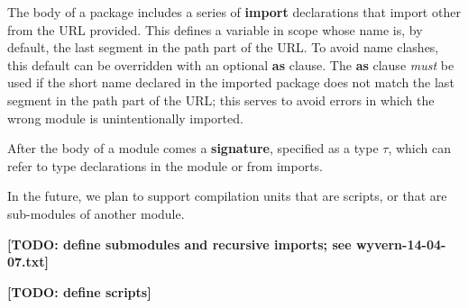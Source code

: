 \documentclass[11pt]{article}
\newcommand{\TODO}[1]{\textbf{[TODO: #1]}}
\newcommand{\keyw}[1]{\textbf{#1}}
\begin{document}
\begin{sloppypar}
The body of a package includes a series of \keyw{import} declarations that import other from the URL provided.  This defines a variable in scope whose name is, by default, the last segment in the path part of the URL.  To avoid name clashes, this default can be overridden with an optional \keyw{as} clause.  The \keyw{as} clause \textit{must} be used if the short name declared in the imported package does not match the last segment in the path part of the URL; this serves to avoid errors in which the wrong module is unintentionally imported.

After the body of a module comes a \keyw{signature}, specified as a type $\tau$, which can refer to type declarations in the module or from imports.  

In the future, we plan to support compilation units that are scripts, or that are sub-modules of another module.

\TODO{define submodules and recursive imports; see wyvern-14-04-07.txt}

\TODO{define scripts}





\end{sloppypar}
\end{document}

